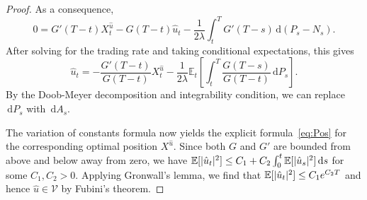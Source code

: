 \documentclass[11pt]{article}
\theoremstyle{definition}
\theoremstyle{remark}
\newcommand{\E}{\mathbb{E}} %
\DeclarePairedDelimiter{\abs}{\lvert}{\rvert} %
\newcommand{\ts}{\textstyle}
\newcommand{\de}{\,\mathrm{d}}
\begin{document}
\begin{proof}
As a consequence,
$$
0=G'(T-t)X^{\hat{u}}_t-G(T-t)\hat{u}_t-\frac{1}{2\lambda}\int_t^T G'(T-s) \de (P_s-N_s).
$$
After solving for the trading rate and taking conditional expectations, this gives
$$
\hat{u}_t = -\frac{G'(T-t)}{G(T-t)} X^{\hat{u}}_t - \frac{1}{2\lambda} \E_t\left[\int_t^T\frac{G(T-s)}{G(T-t)} \de P_s\right].
$$
By the Doob-Meyer decomposition and integrability condition, we can replace $\de P_s$ with $\de A_s$.

The variation of constants formula now yields the explicit formula~\eqref{eq:Pos} for the corresponding optimal position $X^{\hat{u}}$.
Since both $G$ and $G'$ are bounded from above and below away from zero, we have $\E[\abs{\hat{u}_t}^2] \le C_1 +C_2\int_0^t \E[\abs{\hat{u}_s}^2] \de s$ for some $C_1, C_2 > 0$. Applying Gronwall's lemma, we find that $\E[\abs{\hat{u}_t}^2]\le C_1 e^{C_2 T}$ and hence $\hat{u}\in\mathcal V$ by Fubini's theorem.



\end{proof}
\end{document}
